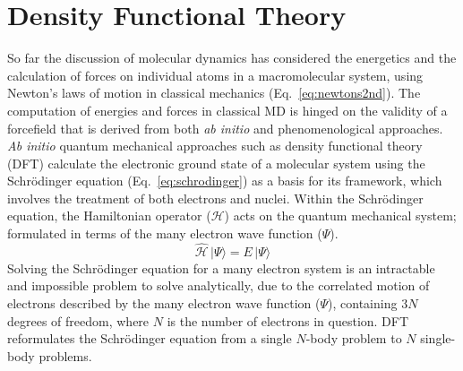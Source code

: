 \section{Density Functional Theory} \label{chapter:onetep}
So far the discussion of molecular dynamics has considered the energetics and the calculation of forces on individual atoms in a macromolecular system, using Newton's  laws of motion in classical mechanics (Eq.~\ref{eq:newtons2nd}). The computation of energies and forces in classical MD is hinged on the validity of a forcefield that is derived from both \textit{ab initio} and phenomenological approaches. \textit{Ab initio} quantum mechanical approaches such as density functional theory (DFT) calculate the electronic ground state of a molecular system using the Schr\"odinger equation (Eq.~\ref{eq:schrodinger}) as a basis for its framework, which involves the treatment of both electrons and nuclei. Within the Schr\"odinger equation, the Hamiltonian operator ($\mathcal{H}$) acts on the quantum mechanical system; formulated in terms of the many electron wave function ($\Psi$).\cite{Schrodinger1926undulatory}
%
\begin{equation} \label{eq:schrodinger}
    \mathcal{\hat{H}}\, | \Psi \rangle = E \, | \Psi \rangle
\end{equation}
%
Solving the Schr\"odinger equation for a many electron system is an intractable and impossible problem to solve analytically, due to the correlated motion of electrons described by the many electron wave function ($\Psi$), containing $3N$ degrees of freedom, where $N$ is the number of electrons in question. DFT reformulates the Schr\"odinger equation from a single $N$-body problem to $N$ single-body problems.

